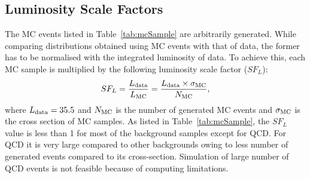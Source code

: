 \subsection{Luminosity Scale Factors}
\label{s:lumi_sf}

The MC events listed in Table~\ref{tab:mcSample} are arbitrarily generated.
While comparing distributions obtained using MC events with that of data, 
the former has to be normalised with the integrated luminosity of data.
To achieve this, each MC sample is multiplied by the following luminosity scale 
factor ($SF_{L}$):
\begin{equation}
SF_{L}=\frac{L_{\rm data}}{L_{\rm MC}} = \frac{L_{\rm data}\times\sigma_{\rm MC}}{N_{\rm MC}},
\label{eq:lumiSF}
\end{equation}
where $L_{\rm data} = 35.5$ \fbinv and $N_{\rm MC}$ is the number of 
generated MC events and $\sigma_{\rm MC}$ is the cross section of MC samples.
As listed in Table~\ref{tab:mcSample}, the $SF_{L}$ value is less than 1 for 
most of the background samples except for QCD.
For QCD it is very large compared to other backgrounds owing to less number of 
generated events compared to its cross-section. Simulation of large number of 
QCD events is not feasible because of computing limitations.  


